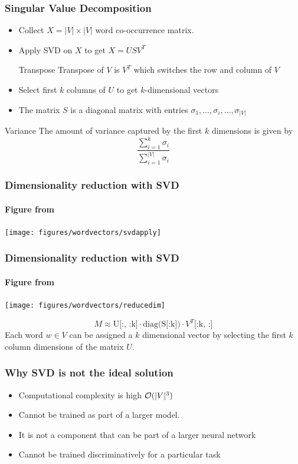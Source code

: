 \begin{frame}
\frametitle{Singular Value Decomposition}
\begin{itemize}[<+->]
\item Collect $X = |V| \times |V|$ word co-occurrence matrix.
\item Apply SVD on $X$ to get $X = U S V^T$
\pause
\begin{block}{Transpose}
Transpose of $V$ is $V^T$ which switches the row and column of $V$
\end{block}
\item Select first $k$ columns of $U$ to get $k$-dimensional vectors
\item The matrix $S$ is a diagonal matrix with entries $\sigma_1, \ldots, \sigma_i, \ldots, \sigma_{|V|}$
\end{itemize}
\pause 
\begin{alertblock}{Variance}
The amount of variance captured by the first $k$ dimensions is given by
\[ \frac{\sum_{i=1}^k \sigma_i}{\sum_{i=1}^{|V|} \sigma_i} \]\end{alertblock}
\end{frame}

\begin{frame}
\frametitle{Dimensionality reduction with SVD}
\framesubtitle{Figure from \cite{cs224n}}
\texttt{[image: figures/wordvectors/svdapply]}	
\end{frame}

\begin{frame}
\frametitle{Dimensionality reduction with SVD}
\framesubtitle{Figure from \cite{cs224n}}
\texttt{[image: figures/wordvectors/reducedim]}	
\begin{center}
\[ M \approx \mbox{U[:, :k]} \cdot \mbox{diag(S[:k])} \cdot V^T\mbox{[:k, :]} \]
Each word $w \in V$ can be assigned a $k$ dimensional vector by selecting the first $k$ column dimensions of the matrix $U$.
\end{center}
\end{frame}

\begin{frame}
\frametitle{Why SVD is not the ideal solution}
\begin{itemize}[<+->]
	\item Computational complexity is high ${\cal O}(|V|^3)$
	\item Cannot be trained as part of a larger model. 
	\item It is not a component that can be part of a larger neural network
	\item Cannot be trained discriminatively for a particular task
\end{itemize}
\end{frame}

